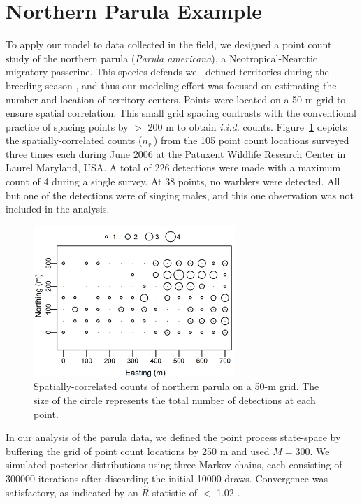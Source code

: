 \section{Northern Parula Example}



To apply our model to data collected in the field, we designed a point
count study of the northern parula ({\it Parula americana}), a
Neotropical-Nearctic migratory passerine. This species defends
well-defined territories during the breeding season
\citep{moldenhaer_regelski:1996}, and thus our modeling effort was focused
on estimating the number and location of territory centers. Points
were located on a 50-m grid to ensure spatial
correlation. This small grid spacing contrasts with the conventional
practice of spacing points by $>$ 200 m to obtain \emph{i.i.d.}
counts. Figure~\ref{fig:nopaDat} depicts the spatially-correlated
counts ($n_{r.}$) from the 105 point count locations
surveyed three times each during June 2006
at the Patuxent Wildlife Research Center in Laurel Maryland, USA.
A total of 226 detections were made with a maximum count of 4 during a
single survey. At 38 points, no warblers were detected. All but one of
the detections were of singing males, and this one observation was
not included in the analysis.



\begin{figure}
  \centering
  \includegraphics[width=3in,height=2.25in]{Ch14/figs/nopa}
  \caption{Spatially-correlated counts of northern parula on a 50-m
    grid. The size of the circle represents the total number of
    detections at each point.}
  \label{fig:nopaDat}
\end{figure}



In our analysis of the parula data, we defined the point process
state-space by buffering the grid of point
count locations by 250 m and used $M=300$. We simulated posterior
distributions using three Markov chains,
each consisting of 300000 iterations after discarding the initial 10000
draws. Convergence was satisfactory, as indicated by an $\hat{R}$
statistic of $<$ 1.02 \citep{gelman_rubin:1992}.


